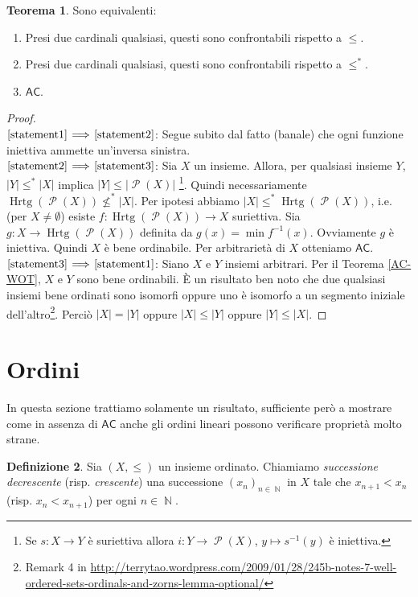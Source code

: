 \documentclass[12pt,a4paper]{report}
\theoremstyle{definition}
\newtheorem{teo}{Teorema}[section]  %
\newtheorem{defn}[teo]{Definizione}  %
\theoremstyle{num.custom-title}
\DeclareMathOperator{\PP}{\mathcal{P}}
\DeclareMathOperator{\Hrtg}{\text{Hrtg}}
\DeclareMathOperator{\N}{\mathbb{N}}
\newcommand{\AC}{\ensuremath{\mathsf{AC}}\xspace}
\newcommand{\Implies}[2]{$\text{\ref{statement#1}}\!\implies\!\text{\ref{statement#2}}$}%
\newcommand{\punto}[1]{\item \label{statement#1}}
\newenvironment{equivalence}
    {\begin{enumerate}[label=(\arabic*),ref=(\arabic*)]
    }
    { 
	\end{enumerate}
    }
\begin{document}
\begin{teo} Sono equivalenti:
\begin{equivalence}
\punto{1} Presi due cardinali qualsiasi, questi sono confrontabili rispetto a $\leq$.
\punto{2} Presi due cardinali qualsiasi, questi sono confrontabili rispetto a $\leq^*$.
\punto{3} \AC.
\end{equivalence}
\begin{proof}\ \\
\Implies{1}{2}: Segue subito dal fatto (banale) che ogni funzione iniettiva ammette un'inversa sinistra.\\
\Implies{2}{3}: Sia $X$ un insieme. Allora, per qualsiasi insieme $Y$, $|Y| \leq^* |X|$ implica $|Y| \leq |\PP(X)|$ \footnote{Se $s: X \to Y$ è suriettiva allora $i: Y \to \PP(X)$, $y \mapsto s^{-1}(y)$ è iniettiva.}. Quindi necessariamente $\Hrtg(\PP(X)) \not\leq^* |X|$. Per ipotesi abbiamo $|X| \leq^* \Hrtg(\PP(X))$, i.e. (per $X \neq \emptyset$) esiste $f: \Hrtg(\PP(X)) \to X$ suriettiva. Sia $g: X \to \Hrtg(\PP(X))$ definita da $g(x)=\min f^{-1}(x)$. Ovviamente $g$ è iniettiva. Quindi $X$ è bene ordinabile. Per arbitrarietà di $X$ otteniamo \AC.\\
\Implies{3}{1}: Siano $X$ e $Y$ insiemi arbitrari.  Per il Teorema \ref{AC-WOT}, $X$ e $Y$ sono bene ordinabili. È un risultato ben noto che due qualsiasi insiemi bene ordinati sono isomorfi oppure uno è isomorfo a un segmento iniziale dell'altro\footnote{Remark 4 in \url{http://terrytao.wordpress.com/2009/01/28/245b-notes-7-well-ordered-sets-ordinals-and-zorns-lemma-optional/}}. Perciò $|X|=|Y|$ oppure $|X| \leq |Y|$ oppure $|Y| \leq |X|$.
\end{proof}
\end{teo}


\section{Ordini}

In questa sezione trattiamo solamente un risultato, sufficiente però a mostrare come in assenza di \AC anche gli ordini lineari possono verificare proprietà molto strane.

\begin{defn}
Sia $(X, \leq)$ un insieme ordinato. Chiamiamo \emph{successione decrescente} (risp. \emph{crescente}) una successione $(x_n)_{n \in \N}$ in $X$ tale che $x_{n+1} < x_n$ (risp. $x_n < x_{n+1}$) per ogni $n \in \N$.
\end{defn}
\end{document}
